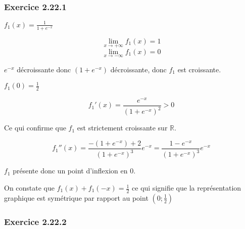 \documentclass{report}
\begin{document}
\subsubsection*{Exercice 2.22.1}

$f_1(x) = \frac{1}{1+e^{-x}}$

\begin{displaymath}
	\lim_{x \rightarrow +\infty} f_1(x) = 1
\end{displaymath}
\begin{displaymath}
	\lim_{x \rightarrow -\infty} f_1(x) = 0
\end{displaymath}

$e^{-x}$ décroissante donc $(1+e^{-x})$ décroissante, donc $f_1$ est croissante.

$f_1(0) = \frac{1}{2}$

\begin{displaymath}
	f_1'(x) = \frac{e^{-x}}{(1+e^{-x})^2} > 0
\end{displaymath}

Ce qui confirme que $f_1$ est strictement croissante sur $\mathbb{R}$.

\begin{displaymath}
	f_1''(x) = \frac{-(1+e^{-x})+2}{(1+e^{-x})^3}e^{-x}
	         = \frac{1-e^{-x}}{(1+e^{-x})^3}e^{-x}
\end{displaymath}

$f_1$ présente donc un point d'inflexion en $0$.

On constate que $f_1(x) + f_1(-x) = \frac{1}{2}$ ce qui signifie que la représentation
graphique est symétrique par rapport au point $(0 ; \frac{1}{2})$





\subsubsection*{Exercice 2.22.2}
\end{document}
